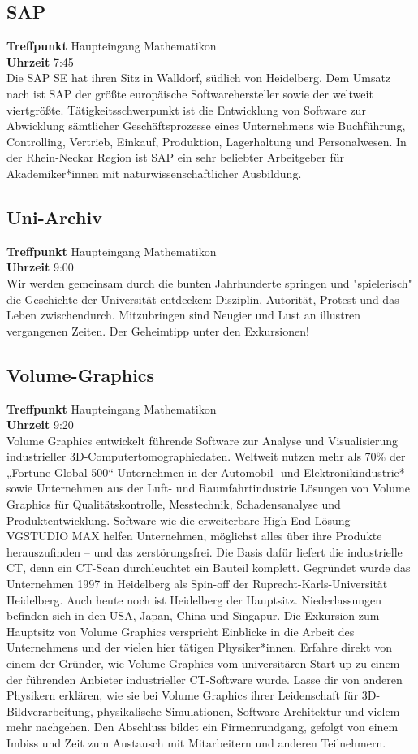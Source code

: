 \subsection*{SAP}
\textbf{Treffpunkt} Haupteingang Mathematikon\\
\textbf{Uhrzeit} 7:45\\
Die SAP SE hat ihren Sitz in Walldorf, südlich von Heidelberg. Dem Umsatz nach ist SAP der größte europäische Softwarehersteller sowie der weltweit viertgrößte. Tätigkeitsschwerpunkt ist die Entwicklung von Software zur Abwicklung sämtlicher Geschäftsprozesse eines Unternehmens wie Buchführung, Controlling, Vertrieb, Einkauf, Produktion, Lagerhaltung und Personalwesen. In der Rhein-Neckar Region ist SAP ein sehr beliebter Arbeitgeber für Akademiker*innen mit naturwissenschaftlicher Ausbildung. 

\subsection*{Uni-Archiv}
\textbf{Treffpunkt} Haupteingang Mathematikon\\
\textbf{Uhrzeit} 9:00\\
Wir werden gemeinsam durch die bunten Jahrhunderte springen und "spielerisch" die Geschichte der Universität entdecken: Disziplin, Autorität, Protest und das Leben zwischendurch. Mitzubringen sind Neugier und Lust an illustren vergangenen Zeiten. Der Geheimtipp unter den Exkursionen! 

\subsection*{Volume-Graphics}
\textbf{Treffpunkt} Haupteingang Mathematikon\\
\textbf{Uhrzeit} 9:20\\
Volume Graphics entwickelt führende Software zur Analyse und Visualisierung industrieller 3D-Computertomographiedaten. Weltweit nutzen mehr als 70\% der „Fortune Global 500“-Unternehmen in der Automobil- und Elektronikindustrie* sowie Unternehmen aus der Luft- und Raumfahrtindustrie Lösungen von Volume Graphics für Qualitätskontrolle, Messtechnik, Schadensanalyse und Produktentwicklung. Software wie die erweiterbare High-End-Lösung VGSTUDIO MAX helfen Unternehmen, möglichst alles über ihre Produkte herauszufinden – und das zerstörungsfrei. Die Basis dafür liefert die industrielle CT, denn ein CT-Scan durchleuchtet ein Bauteil komplett. Gegründet wurde das Unternehmen 1997 in Heidelberg als Spin-off der Ruprecht-Karls-Universität Heidelberg. Auch heute noch ist Heidelberg der Hauptsitz. Niederlassungen befinden sich in den USA, Japan, China und Singapur. Die Exkursion zum Hauptsitz von Volume Graphics verspricht Einblicke in die Arbeit des Unternehmens und der vielen hier tätigen Physiker*innen. Erfahre direkt von einem der Gründer, wie Volume Graphics vom universitären Start-up zu einem der führenden Anbieter industrieller CT-Software wurde. Lasse dir von anderen Physikern erklären, wie sie bei Volume Graphics ihrer Leidenschaft für 3D-Bildverarbeitung, physikalische Simulationen, Software-Architektur und vielem mehr nachgehen. Den Abschluss bildet ein Firmenrundgang, gefolgt von einem Imbiss und Zeit zum Austausch mit Mitarbeitern und anderen Teilnehmern. 


